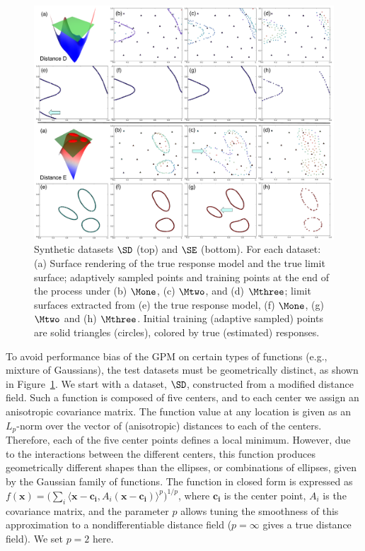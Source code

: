 \begin{figure}[ht]
\centering
\includegraphics[width=1.0\textwidth]{figs/chap5/synthetic-D-E-DF.pdf}
\caption{Synthetic datasets $\protect\SD$ (top) and $\protect\SE$ (bottom).
For each dataset: (a) Surface rendering of the true response model and the true limit surface; adaptively sampled points and training points at the end of the process under (b) $\protect\Mone$, (c) $\protect\Mtwo$, and (d) $\protect\Mthree$;
limit surfaces extracted from (e) the true response model, (f) $\protect\Mone$, (g) $\protect\Mtwo$ and (h) $\protect\Mthree$.
Initial training (adaptive sampled) points are solid triangles (circles), colored by true (estimated)  responses.
}
\label{fig:synthetic-D-E-DF}
\end{figure}

To avoid performance bias of the GPM on certain types of functions (e.g., mixture of Gaussians), the test datasets must be geometrically distinct, as shown in Figure~\ref{fig:synthetic-D-E-DF}.
%
We start with a dataset, $\SD$, constructed from a modified distance field.
%
Such a function is composed of five centers, and to each center we assign an anisotropic covariance matrix.
%
The function value at any location is given as an $L_p$-norm over the vector of (anisotropic) distances to each of the centers.
%
Therefore, each of the five center points defines a local minimum.
%
However, due to the interactions between the different centers, this function produces geometrically different shapes than the ellipses, or combinations of ellipses, given by the Gaussian family of functions.
%
The function in closed form is expressed as
$f(\mathbf{x}) = \bigl(\sum_i \langle\mathbf{x}-\mathbf{c_i},A_i(\mathbf{x}-\mathbf{c_i})
\rangle^{p}\bigr)^{1/p}$, where $\mathbf{c_i}$ is the center point, $A_i$ is the covariance matrix, and the parameter $p$ allows tuning the smoothness of this approximation to a nondifferentiable distance field ($p = \infty$ gives a true distance field).
%
We set $p=2$ here.


